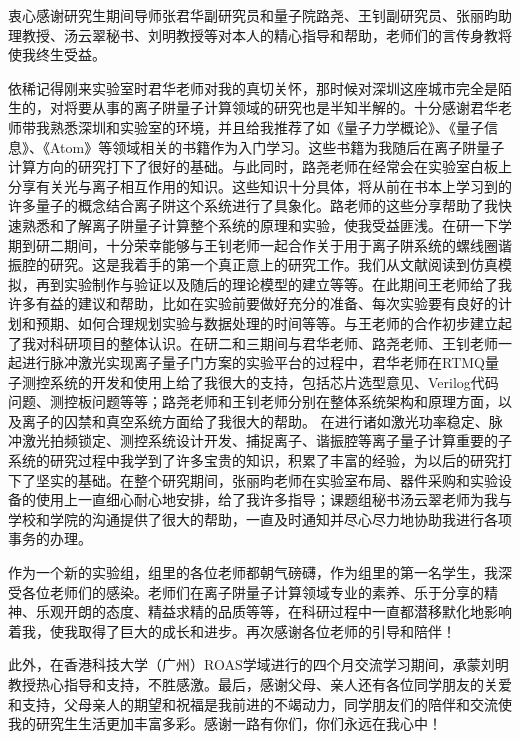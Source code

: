 
\begin{acknowledgements}
  衷心感谢研究生期间导师张君华副研究员和量子院路尧、王钊副研究员、张丽昀助理教授、汤云翠秘书、刘明教授等对本人的精心指导和帮助，老师们的言传身教将使我终生受益。

  依稀记得刚来实验室时君华老师对我的真切关怀，那时候对深圳这座城市完全是陌生的，对将要从事的离子阱量子计算领域的研究也是半知半解的。十分感谢君华老师带我熟悉深圳和实验室的环境，并且给我推荐了如《量子力学概论》、《量子信息》、《Atom》等领域相关的书籍作为入门学习。这些书籍为我随后在离子阱量子计算方向的研究打下了很好的基础。与此同时，路尧老师在经常会在实验室白板上分享有关光与离子相互作用的知识。这些知识十分具体，将从前在书本上学习到的许多量子的概念结合离子阱这个系统进行了具象化。路老师的这些分享帮助了我快速熟悉和了解离子阱量子计算整个系统的原理和实验，使我受益匪浅。在研一下学期到研二期间，十分荣幸能够与王钊老师一起合作关于用于离子阱系统的螺线圈谐振腔的研究。这是我着手的第一个真正意上的研究工作。我们从文献阅读到仿真模拟，再到实验制作与验证以及随后的理论模型的建立等等。在此期间王老师给了我许多有益的建议和帮助，比如在实验前要做好充分的准备、每次实验要有良好的计划和预期、如何合理规划实验与数据处理的时间等等。与王老师的合作初步建立起了我对科研项目的整体认识。在研二和三期间与君华老师、路尧老师、王钊老师一起进行脉冲激光实现离子量子门方案的实验平台的过程中，君华老师在RTMQ量子测控系统的开发和使用上给了我很大的支持，包括芯片选型意见、Verilog代码问题、测控板问题等等；路尧老师和王钊老师分别在整体系统架构和原理方面，以及离子的囚禁和真空系统方面给了我很大的帮助。
  在进行诸如激光功率稳定、脉冲激光拍频锁定、测控系统设计开发、捕捉离子、谐振腔等离子量子计算重要的子系统的研究过程中我学到了许多宝贵的知识，积累了丰富的经验，为以后的研究打下了坚实的基础。在整个研究期间，张丽昀老师在实验室布局、器件采购和实验设备的使用上一直细心耐心地安排，给了我许多指导；课题组秘书汤云翠老师为我与学校和学院的沟通提供了很大的帮助，一直及时通知并尽心尽力地协助我进行各项事务的办理。
  
  作为一个新的实验组，组里的各位老师都朝气磅礴，作为组里的第一名学生，我深受各位老师们的感染。老师们在离子阱量子计算领域专业的素养、乐于分享的精神、乐观开朗的态度、精益求精的品质等等，在科研过程中一直都潜移默化地影响着我，使我取得了巨大的成长和进步。再次感谢各位老师的引导和陪伴！



  此外，在香港科技大学（广州）ROAS学域进行的四个月交流学习期间，承蒙刘明教授热心指导和支持，不胜感激。最后，感谢父母、亲人还有各位同学朋友的关爱和支持，父母亲人的期望和祝福是我前进的不竭动力，同学朋友们的陪伴和交流使我的研究生生活更加丰富多彩。感谢一路有你们，你们永远在我心中！

\end{acknowledgements}
